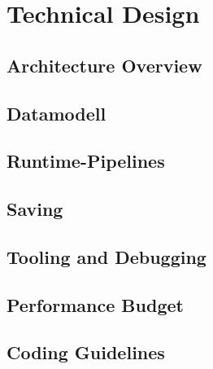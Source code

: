 \section{Technical Design}

\subsection{Architecture Overview}

\subsection{Datamodell}

\subsection{Runtime-Pipelines}

\subsection{Saving}

\subsection{Tooling and Debugging}

\subsection{Performance Budget}

\subsection{Coding Guidelines}
